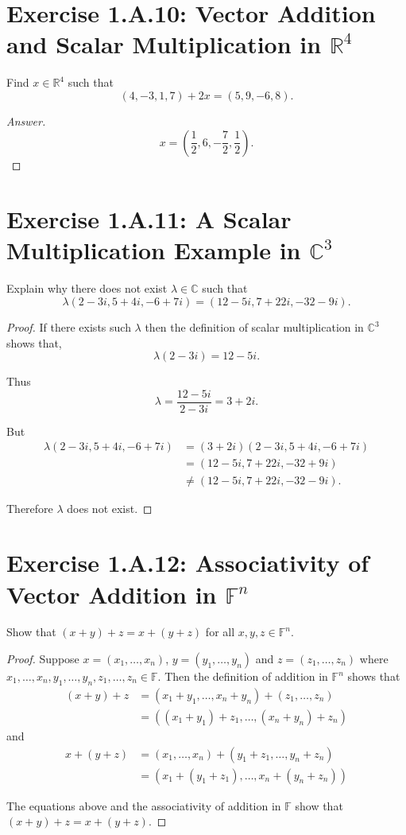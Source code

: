 \section{Exercise 1.A.10: Vector Addition and Scalar Multiplication in $\mathbb{R}^4$}
Find $x\in\mathbb{R}^4$ such that
\[
(4,-3,1,7)+2x=(5,9,-6,8).
\]
\begin{proof}[Answer]
\[
x=\left(\frac{1}{2},6,-\frac{7}{2},\frac{1}{2}\right).
\]
\end{proof}

\section{Exercise 1.A.11: A Scalar Multiplication Example in $\mathbb{C}^3$}
Explain why there does not exist $\lambda\in\mathbb{C}$ such that
\[
\lambda(2-3i,5+4i,-6+7i)=(12-5i,7+22i,-32-9i).
\]
\begin{proof}
If there exists such $\lambda$ then the definition of scalar multiplication in $\mathbb{C}^3$ shows that,
\[
\lambda(2-3i)=12-5i.
\]

Thus
\[
\lambda=\frac{12-5i}{2-3i}=3+2i.
\]

But
\begin{equation*}
\begin{split}
\lambda(2-3i,5+4i,-6+7i)&=(3+2i)(2-3i,5+4i,-6+7i)\\
&=(12-5i,7+22i,-32+9i)\\
&\ne(12-5i,7+22i,-32-9i).
\end{split}
\end{equation*}

Therefore $\lambda$ does not exist.
\end{proof}

\section{Exercise 1.A.12: Associativity of Vector Addition in $\mathbb{F}^n$}
Show that $(x+y)+z=x+(y+z)$ for all $x,y,z\in\mathbb{F}^n$.
\begin{proof}
Suppose $x=(x_1,\dots,x_n)$, $y=(y_1,\dots,y_n)$ and $z=(z_1,\dots,z_n)$ where $x_1,\dots,x_n,y_1,\dots,y_n,z_1,\dots,z_n\in\mathbb{F}$. Then the definition of addition in $\mathbb{F}^n$ shows that
\begin{equation*}
\begin{split}
(x+y)+z&=(x_1+y_1,\dots,x_n+y_n)+(z_1,\dots,z_n)\\
&=((x_1+y_1)+z_1,\dots,(x_n+y_n)+z_n)
\end{split}
\end{equation*}
and
\begin{equation*}
\begin{split}
x+(y+z)&=(x_1,\dots,x_n)+(y_1+z_1,\dots,y_n+z_n)\\
&=(x_1+(y_1+z_1),\dots,x_n+(y_n+z_n))
\end{split}
\end{equation*}

The equations above and the associativity of addition in $\mathbb{F}$ show that $(x+y)+z=x+(y+z)$.
\end{proof}

